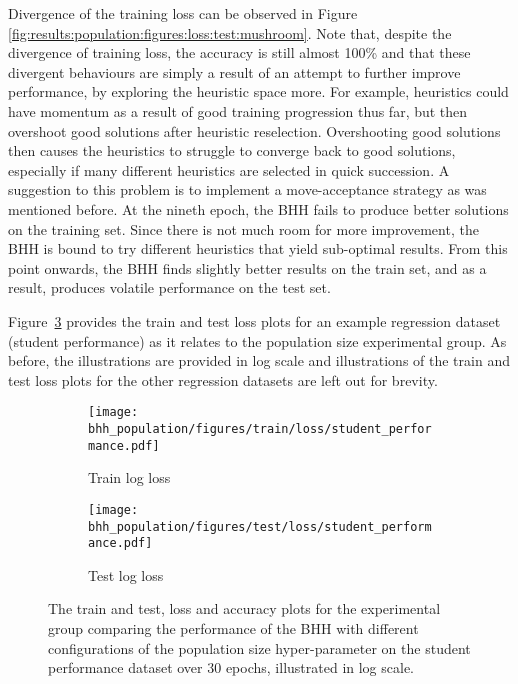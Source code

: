 Divergence of the training loss can be observed in Figure \ref{fig:results:population:figures:loss:test:mushroom}. Note that, despite the divergence of training loss, the accuracy is still almost 100\% and that these divergent behaviours are simply a result of an attempt to further improve performance, by exploring the heuristic space more. For example, heuristics could have momentum as a result of good training progression thus far, but then overshoot good solutions after heuristic reselection. Overshooting good solutions then causes the heuristics to struggle to converge back to good solutions, especially if many different heuristics are selected in quick succession. A suggestion to this problem is to implement a move-acceptance strategy as was mentioned before. At the nineth epoch, the \acs{BHH} fails to produce better solutions on the training set. Since there is not much room for more improvement, the \acs{BHH} is bound to try different heuristics that yield sub-optimal results. From this point onwards, the \acs{BHH} finds slightly better results on the train set, and as a result, produces volatile performance on the test set.

Figure~\ref{fig:results:population:figures:student_performance} provides the train and test loss plots for an example regression dataset (student performance) as it relates to the population size experimental group. As before, the illustrations are provided in log scale and illustrations of the train and test loss plots for the other regression datasets are left out for brevity.

\begin{figure}[htbp]
      \begin{subfigure}{0.5\textwidth}
            \centering
            \texttt{[image: bhh\_population/figures/train/loss/student\_performance.pdf]}
            \caption{Train log loss}
            \label{fig:results:population:figures:loss:train:student_performance}
      \end{subfigure}
      \begin{subfigure}{0.5\textwidth}
            \centering
            \texttt{[image: bhh\_population/figures/test/loss/student\_performance.pdf]}
            \caption{Test log loss}
            \label{fig:results:population:figures:loss:test:student_performance}
      \end{subfigure}
      \par\bigskip
      \caption{The train and test, loss and accuracy plots for the experimental group comparing the performance of the \acs{BHH} with different configurations of the population size hyper-parameter on the student performance dataset over 30 epochs, illustrated in log scale.}
      \label{fig:results:population:figures:student_performance}
\end{figure}


